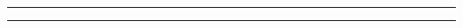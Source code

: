 \documentclass{wmu-thesis}
\begin{document}
\singlespace
{}
\noindent\rule{\textwidth}{1pt}
\doublespace
{}
\noindent\rule{\textwidth}{1pt}
\begin{spacing}{2}
\end{spacing}
\end{document}
